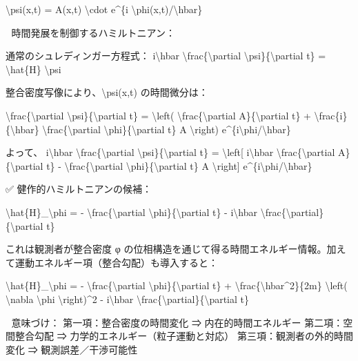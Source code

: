 \documentclass{article}
\begin{document}
\textbackslash{}psi(x,t) = A(x,t) \textbackslash{}cdot e\textasciicircum{}\{i \textbackslash{}phi(x,t)/\textbackslash{}hbar\}

🎯 時間発展を制御するハミルトニアン：

通常のシュレディンガー方程式：
i\textbackslash{}hbar \textbackslash{}frac\{\textbackslash{}partial \textbackslash{}psi\}\{\textbackslash{}partial t\} = \textbackslash{}hat\{H\} \textbackslash{}psi

整合密度写像により、\textbackslash{}psi(x,t) の時間微分は：

\textbackslash{}frac\{\textbackslash{}partial \textbackslash{}psi\}\{\textbackslash{}partial t\} = \textbackslash{}left( \textbackslash{}frac\{\textbackslash{}partial A\}\{\textbackslash{}partial t\} + \textbackslash{}frac\{i\}\{\textbackslash{}hbar\} \textbackslash{}frac\{\textbackslash{}partial \textbackslash{}phi\}\{\textbackslash{}partial t\} A \textbackslash{}right) e\textasciicircum{}\{i\textbackslash{}phi/\textbackslash{}hbar\}

よって、
i\textbackslash{}hbar \textbackslash{}frac\{\textbackslash{}partial \textbackslash{}psi\}\{\textbackslash{}partial t\} = \textbackslash{}left[ i\textbackslash{}hbar \textbackslash{}frac\{\textbackslash{}partial A\}\{\textbackslash{}partial t\} - \textbackslash{}frac\{\textbackslash{}partial \textbackslash{}phi\}\{\textbackslash{}partial t\} A \textbackslash{}right] e\textasciicircum{}\{i\textbackslash{}phi/\textbackslash{}hbar\}

✅ 健作的ハミルトニアンの候補：

\textbackslash{}hat\{H\}\_\textbackslash{}phi = - \textbackslash{}frac\{\textbackslash{}partial \textbackslash{}phi\}\{\textbackslash{}partial t\} - i\textbackslash{}hbar \textbackslash{}frac\{\textbackslash{}partial\}\{\textbackslash{}partial t\}

これは観測者が整合密度 φ の位相構造を通じて得る時間エネルギー情報。加えて運動エネルギー項（整合勾配）も導入すると：

\textbackslash{}hat\{H\}\_\textbackslash{}phi = - \textbackslash{}frac\{\textbackslash{}partial \textbackslash{}phi\}\{\textbackslash{}partial t\} + \textbackslash{}frac\{\textbackslash{}hbar\textasciicircum{}2\}\{2m\} \textbackslash{}left( \textbackslash{}nabla \textbackslash{}phi \textbackslash{}right)\textasciicircum{}2 - i\textbackslash{}hbar \textbackslash{}frac\{\textbackslash{}partial\}\{\textbackslash{}partial t\}

🔄 意味づけ：
第一項：整合密度の時間変化 ⇒ 内在的時間エネルギー
第二項：空間整合勾配 ⇒ 力学的エネルギー（粒子運動と対応）
第三項：観測者の外的時間変化 ⇒ 観測誤差／干渉可能性
\end{document}
